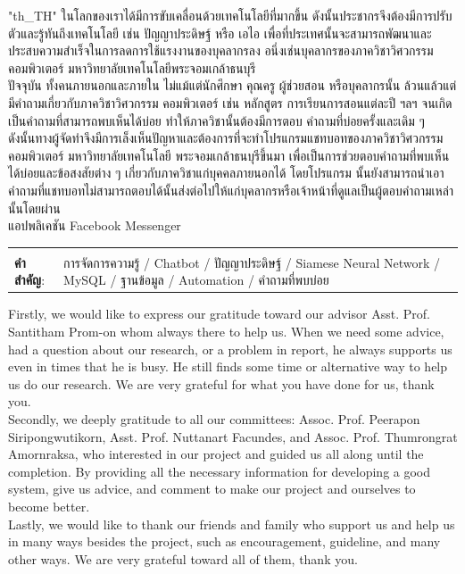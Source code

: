 \documentclass[12pt,oneside,openright,a4paper]{cpe-english-project}
\begin{document}
{
\XeTeXlinebreaklocale "th_TH"	
\thaifont
\thaiabstract
ในโลกของเราได้มีการขับเคลื่อนด้วยเทคโนโลยีที่มากขึ้น ดังนั้นประชากรจึงต้องมีการปรับตัวและรู้ทันถึงเทคโนโลยี เช่น ปัญญาประดิษฐ์ หรือ 
เอไอ เพื่อที่ประเทศนั้นจะสามารถพัฒนาและประสบความสำเร็จในการลดการใช้แรงงานของบุคลากรลง อนึ่งเช่นบุคลากรของภาควิชาวิศวกรรม
คอมพิวเตอร์ มหาวิทยาลัยเทคโนโลยีพระจอมเกล้าธนบุรี\\
ปัจจุบัน ทั้งคนภายนอกและภายใน ไม่แม้แต่นักศึกษา คุณครู ผู้ช่วยสอน หรือบุคลากรนั้น ล้วนแล้วแต่มีคำถามเกี่ยวกับภาควิชาวิศวกรรม
คอมพิวเตอร์ เช่น หลักสูตร การเรียนการสอนแต่ละปี ฯลฯ จนเกิดเป็นคำถามที่สามารถพบเห็นได้บ่อย ทำให้ภาควิชานั้นต้องมีการตอบ
คำถามที่บ่อยครั้งและเดิม ๆ\\
ดังนั้นทางผู้จัดทำจึงมีการเล็งเห็นปัญหาและต้องการที่จะทำโปรแกรมแชทบอทของภาควิชาวิศวกรรมคอมพิวเตอร์ มหาวิทยาลัยเทคโนโลยี
พระจอมเกล้าธนบุรีขึ้นมา เพื่อเป็นการช่วยตอบคำถามที่พบเห็นได้บ่อยและข้อสงสัยต่าง ๆ เกี่ยวกับภาควิชาแก่บุคคลภายนอกได้ โดยโปรแกรม
นั้นยังสามารถนำเอาคำถามที่แชทบอทไม่สามารถตอบได้นั้นส่งต่อไปให้แก่บุคลากรหรือเจ้าหน้าที่ดูแลเป็นผู้ตอบคำถามเหล่านั้นโดยผ่าน
\\แอปพลิเคชัน Facebook Messenger

\begin{flushleft}
\begin{tabular*}{\textwidth}{@{}lp{}}
 & \\

\textbf{คำสำคัญ}: & การจัดการความรู้ / Chatbot / ปัญญาประดิษฐ์ / Siamese Neural Network / MySQL / ฐานข้อมูล / Automation / คำถามที่พบบ่อย
\end{tabular*}
\end{flushleft}
\endabstract
}

\preface
Firstly, we would like to express our gratitude toward our advisor Asst. Prof. Santitham Prom-on whom always 
there to help us. When we need some advice, had a question about our research, or a problem in report, he 
always supports us even in times that he is busy. He still finds some time or alternative way to help us do our 
research. We are very grateful for what you have done for us, thank you.
\\Secondly, we deeply gratitude to all our committees: Assoc. Prof. Peerapon Siripongwutikorn, Asst. 
Prof. Nuttanart Facundes, and Assoc. Prof. Thumrongrat Amornraksa, who interested in our project and guided 
us all along until the completion.  By providing all the necessary information for developing a good system, 
give us advice, and comment to make our project and ourselves to become better.
\\Lastly, we would like to thank our friends and family who support us and help us in many ways besides the 
project, such as encouragement, guideline, and many other ways. We are very grateful toward all of them, 
thank you.
\end{document}
